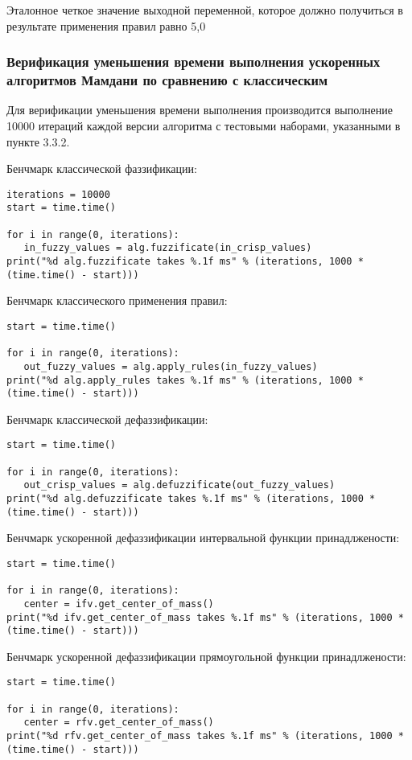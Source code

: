 Эталонное четкое значение выходной переменной, которое должно получиться в результате применения правил равно 5,0


\subsubsection{Верификация уменьшения времени выполнения ускоренных алгоритмов Мамдани по сравнению с классическим }

Для верификации уменьшения времени выполнения производится выполнение 10000 итераций каждой версии алгоритма с тестовыми наборами, указанными в пункте 3.3.2. 

Бенчмарк классической фаззификации:
\begin{lstlisting}[style=pythonstyle,caption={  }, label=lst:func:1]
iterations = 10000
start = time.time()

for i in range(0, iterations):
   in_fuzzy_values = alg.fuzzificate(in_crisp_values)
print("%d alg.fuzzificate takes %.1f ms" % (iterations, 1000 * (time.time() - start)))
\end{lstlisting}

Бенчмарк классического применения правил:
\begin{lstlisting}[style=pythonstyle,caption={  }, label=lst:func:1]
start = time.time()

for i in range(0, iterations):
   out_fuzzy_values = alg.apply_rules(in_fuzzy_values)
print("%d alg.apply_rules takes %.1f ms" % (iterations, 1000 * (time.time() - start)))
\end{lstlisting}

Бенчмарк классической дефаззификации:
\begin{lstlisting}[style=pythonstyle,caption={  }, label=lst:func:1]
start = time.time()

for i in range(0, iterations):
   out_crisp_values = alg.defuzzificate(out_fuzzy_values)
print("%d alg.defuzzificate takes %.1f ms" % (iterations, 1000 * (time.time() - start)))
\end{lstlisting}

Бенчмарк ускоренной дефаззификации интервальной функции принадлжености:

\begin{lstlisting}[style=pythonstyle,caption={  }, label=lst:func:1]
start = time.time()

for i in range(0, iterations):
   center = ifv.get_center_of_mass()
print("%d ifv.get_center_of_mass takes %.1f ms" % (iterations, 1000 * (time.time() - start)))
\end{lstlisting}

Бенчмарк ускоренной дефаззификации прямоугольной функции принадлжености:
\begin{lstlisting}[style=pythonstyle,caption={  }, label=lst:func:1]
start = time.time()

for i in range(0, iterations):
   center = rfv.get_center_of_mass()
print("%d rfv.get_center_of_mass takes %.1f ms" % (iterations, 1000 * (time.time() - start)))
\end{lstlisting}